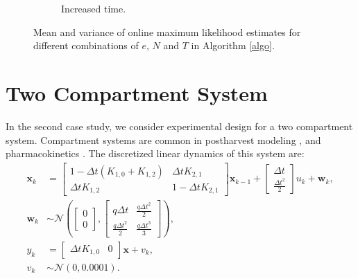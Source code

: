 \begin{figure}[H]
\begin{subfigure}[b]{0.45\textwidth}
		\caption{Increased time.}
		\label{figEnsembleIncrTime}
	\end{subfigure}
	\caption{Mean and variance of online maximum likelihood estimates for different combinations of $e$, $N$ and $T$ in Algorithm \ref{algo}.} 
	\label{fig:analysis}
\end{figure}
\section{Two Compartment System}
In the second case study, we consider experimental design for a two compartment system. Compartment systems are common in postharvest modeling \parencite{lechaudel,yoneyama}, {\color{red}and pharmacokinetics \parencite{fedorov}}. The discretized linear dynamics of this system are:
\begin{equation}
\begin{aligned}
\bm x_k &= \begin{bmatrix}
1 - \Delta t(K_{1,0} + K_{1,2})  & \Delta tK_{2,1}\\
\Delta tK_{1,2} & 1 - \Delta tK_{2,1}
\end{bmatrix} \bm x_{k-1} +
\begin{bmatrix} \Delta t \\ \frac{\Delta t^2}{2}\end{bmatrix} u_k + 
\bm w_k,\\
\bm w_k & \sim  \mathcal{N}\left(\begin{bmatrix}0\\0\end{bmatrix},
\begin{bmatrix} q \Delta t & \frac{q\Delta t^2}{2} \\\frac{q\Delta t^2}{2}  &\frac{q\Delta t^3}{3} \end{bmatrix}\right),\\
y_k &= \begin{bmatrix} \Delta tK_{1,0} & 0 \end{bmatrix} \bm x + v_k, \\
v_k &\sim \mathcal{N}(0,0.0001).
\end{aligned}
\end{equation}
